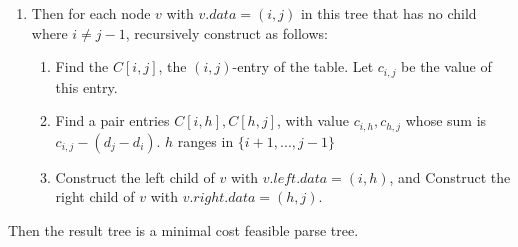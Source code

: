 \documentclass[10pt]{article}
\begin{document}
\begin{enumerate}[label=(\alph*)]
\begin{enumerate}[label=(\arabic*)]
      \item Then for each node $v$ with $v.data=(i,j)$ in this tree that has no
        child where $i \neq j-1$, recursively construct as follows:\\ 
        \begin{enumerate}
          \item Find the $C[i,j]$, the $(i,j)$-entry of the table. Let $c_{i,j}$
            be the value of this entry. 
          \item Find a pair entries $C[i,h], C[h,j]$, with value $c_{i,h},
            c_{h,j}$ whose sum is $c_{i,j} -(d_j-d_i)$. $h$ ranges in $\{i+1,
            ..., j-1\}$ 
          \item Construct the left child of $v$ with $v.left.data=(i,h)$, and
            Construct the right child of $v$ with $v.right.data=(h,j)$. 
        \end{enumerate}
    \end{enumerate}
    Then the result tree is a minimal cost feasible parse tree.
\end{enumerate}
	
\end{document}
